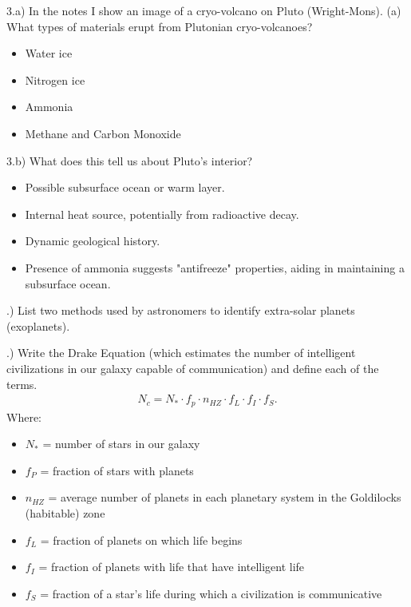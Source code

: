 \documentclass{report}
\begin{document}
    \bigbreak \noindent 
    3.a) In the notes I show an image of a cryo-volcano on Pluto (Wright-Mons). (a) What types of
    materials erupt from Plutonian cryo-volcanoes? 
    \begin{itemize}
        \item Water ice
        \item Nitrogen ice
        \item Ammonia
        \item Methane and Carbon Monoxide
    \end{itemize}

    \bigbreak \noindent 
    3.b) What does this tell us about Pluto’s interior? 
    \begin{itemize}
        \item Possible subsurface ocean or warm layer.
        \item Internal heat source, potentially from radioactive decay.
        \item Dynamic geological history.
        \item Presence of ammonia suggests "antifreeze" properties, aiding in maintaining a subsurface ocean.
    \end{itemize}

    \bigbreak {}.) List two methods used by astronomers to identify extra-solar planets (exoplanets). 
    \bigbreak \noindent 

    \bigbreak {}.) Write the Drake Equation (which estimates the number of intelligent civilizations in our
    galaxy capable of communication) and define each of the terms.
    \bigbreak \noindent 
    \begin{align*}
        N_{c} = N_{*} \cdot f_{p} \cdot n_{HZ} \cdot f_{L} \cdot f_{I} \cdot f_{S}
    .\end{align*}
    Where:
    \begin{itemize}
        \item $N_{*}$  = number of stars in our galaxy
        \item $f_{P}$  = fraction of stars with planets
        \item $n_{HZ}$  = average number of planets in each planetary system in the Goldilocks (habitable) zone
        \item $f_{L}$  = fraction of planets on which life begins
        \item $f_{I}$  = fraction of planets with life that have intelligent life
        \item $f_{S}$  = fraction of a star’s life during which a civilization is communicative
    \end{itemize}
\end{document}
